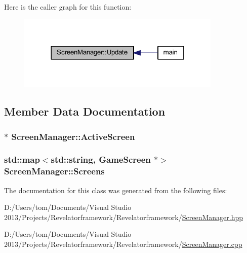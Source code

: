 Here is the caller graph for this function\-:\nopagebreak
\begin{figure}[H]
\begin{center}
\leavevmode
\includegraphics[width=276pt]{class_screen_manager_a269d1b374ba195a036f03bd3caa897d9_icgraph}
\end{center}
\end{figure}




\subsection{Member Data Documentation}
\hypertarget{class_screen_manager_abb46941be1b908a2b9d8053409e89597}{
\subsubsection[{Active\-Screen}]{$\ast$ Screen\-Manager\-::\-Active\-Screen\hspace{0.3cm}{\ttfamily [private]}}}\label{class_screen_manager_abb46941be1b908a2b9d8053409e89597}
\hypertarget{class_screen_manager_a54eb2c9667efda525a35d0d7043e8807}{
\subsubsection[{Screens}]{\setlength{\rightskip}{0pt plus 5cm}std\-::map$<$std\-::string, {\bf Game\-Screen} $\ast$$>$ Screen\-Manager\-::\-Screens\hspace{0.3cm}{\ttfamily [private]}}}\label{class_screen_manager_a54eb2c9667efda525a35d0d7043e8807}


The documentation for this class was generated from the following files\-:\begin{DoxyCompactItemize}
\item 
D\-:/\-Users/tom/\-Documents/\-Visual Studio 2013/\-Projects/\-Revelatorframework/\-Revelatorframework/\hyperlink{_screen_manager_8hpp}{Screen\-Manager.\-hpp}\item 
D\-:/\-Users/tom/\-Documents/\-Visual Studio 2013/\-Projects/\-Revelatorframework/\-Revelatorframework/\hyperlink{_screen_manager_8cpp}{Screen\-Manager.\-cpp}\end{DoxyCompactItemize}
